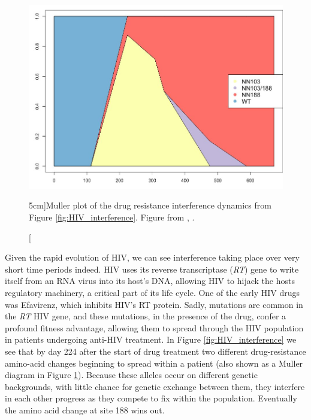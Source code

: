 \begin{figure}
\begin{center}
  \includegraphics[width = 0.7 \textwidth]{Journal_figs/recom_selection/Pleuni_HIV_interference/DdweQyxU0AA7mXe.jpg}
\end{center}
\caption[][5cm]{Muller plot of the drug resistance interference dynamics from Figure \ref{fig:HIV_interference}. Figure from \citet{Williams548198}, \PLOSccBY.} \label{fig:HIV_interference_M}  
\end{figure}
Given the rapid evolution of HIV, we can see interference taking place over very short time periods indeed. HIV uses its reverse transcriptase ({\it RT}) gene to write itself from an RNA virus into its host's DNA, allowing HIV to hijack the hosts regulatory machinery, a critical part of its life cycle. One of the early HIV drugs was Efavirenz, which inhibits HIV's RT protein. Sadly, mutations are common in the {\it RT} HIV gene, and these mutations, in the presence of the drug, confer a profound fitness advantage, allowing them to spread through the HIV population in patients undergoing anti-HIV treatment. In Figure \ref{fig:HIV_interference} we see that by day 224 after the start of drug treatment two different drug-resistance amino-acid changes beginning to spread within a patient (also shown as a Muller diagram in Figure \ref{fig:HIV_interference_M}). Because these alleles occur on different genetic backgrounds, with little chance for genetic exchange between them, they interfere in each other progress as they compete to fix within the population. Eventually the amino acid change at site 188 wins out. 



